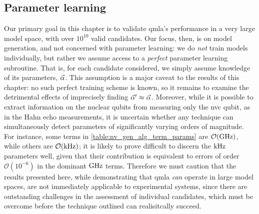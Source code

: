 \subsection{Parameter learning}
Our primary goal in this chapter is to validate \gls{qmla}'s performance in a 
    very large \gls{model space}, with over $10^{10}$ valid candidates. 
Our focus, then, is on model generation, and not concerned with parameter learning:
    we do \emph{not} train models individually, but rather we assume access to a \emph{perfect} parameter learning subroutine.
That is, for each candidate considered, we simply assume knowledge of its parameters, $\vec{\alpha}$. 
This assumption is a major caveat to the results of this chapter: 
    no such perfect training scheme is known, 
    so it remains to examine the detrimental effects of imprecisely finding $\vec{\alpha}^{\prime} \approx \vec{\alpha}$. 
Moreover, while it is possible to extract information on the nuclear qubits from measuring only the 
    \gls{nvc} qubit, as in the Hahn echo measurements, 
    it is uncertain whether any technique can simultaneously detect parameters of significantly varying orders of magnitude.
For instance, some terms in \cref{table:nv_gen_alg_term_params} are $\mathcal{O}(\textrm{GHz})$, 
    while others are $\mathcal{O}(\textrm{kHz})$;
    it is likely to prove difficult to discern the $\textrm{kHz}$ parameters well, given that their contribution is equivalent 
    to errors of order $\mathcal{O}(10^{-6})$ in the dominant $\textrm{GHz}$ terms. 
Therefore we must caution that the results presented here, 
    while demonstrating that \gls{qmla} \emph{can} operate in large model spaces, 
    are not immediately applicable to experimental systems, 
    since there are outstanding challenges in the assessment of individual candidates, 
    which must be overcome before the technique outlined can realisitcally succeed. 


